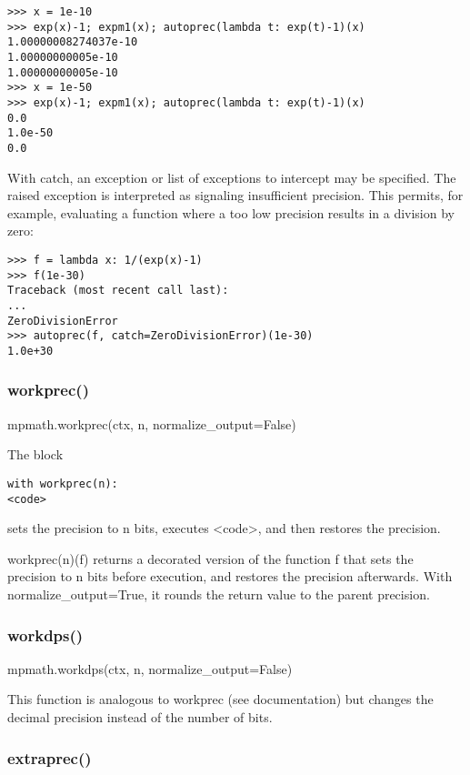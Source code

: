 \begin{lstlisting}
>>> x = 1e-10
>>> exp(x)-1; expm1(x); autoprec(lambda t: exp(t)-1)(x)
1.00000008274037e-10
1.00000000005e-10
1.00000000005e-10
>>> x = 1e-50
>>> exp(x)-1; expm1(x); autoprec(lambda t: exp(t)-1)(x)
0.0
1.0e-50
0.0
\end{lstlisting}

With catch, an exception or list of exceptions to intercept may be specified. The raised exception is interpreted as signaling insufficient precision. This permits, for example, evaluating a function where a too low precision results in a division by zero:

\begin{lstlisting}
>>> f = lambda x: 1/(exp(x)-1)
>>> f(1e-30)
Traceback (most recent call last):
...
ZeroDivisionError
>>> autoprec(f, catch=ZeroDivisionError)(1e-30)
1.0e+30
\end{lstlisting}


\subsubsection{workprec()}

mpmath.workprec(ctx, n, normalize\_output=False)

The block
\begin{lstlisting}
with workprec(n):
<code>
\end{lstlisting}
sets the precision to n bits, executes <code>, and then restores the precision.

\vpara
workprec(n)(f) returns a decorated version of the function f that sets the precision to n bits before execution, and restores the precision afterwards. With normalize\_output=True, it rounds the return value to the parent precision.

\subsubsection{workdps()}

mpmath.workdps(ctx, n, normalize\_output=False)

\vpara
This function is analogous to workprec (see documentation) but changes the decimal precision instead of the number of bits.


\subsubsection{extraprec()}

